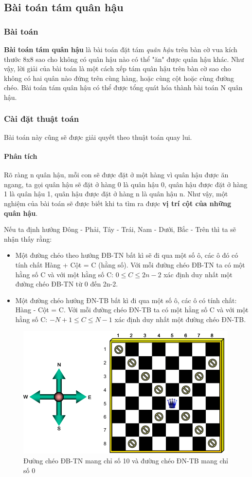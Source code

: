 \documentclass[8pt, a4paper]{article}
\begin{document}
\subsection{Bài toán tám quân hậu}

\subsubsection{Bài toán}
\textbf{Bài toán tám quân hậu} là bài toán đặt tám \emph{quân hậu} trên bàn cờ vua kích thước 8x8 sao cho không có quân hậu nào có thể "ăn" được quân hậu khác. Như vậy, lời giải của bài toán là một cách xếp tám quân hậu trên bàn cờ sao cho không có hai quân nào đứng trên cùng hàng, hoặc cùng cột hoặc cùng đường chéo. Bài toán tám quân hậu có thể được tổng quát hóa thành bài toán N quân hậu.

\subsubsection{Cài đặt thuật toán}
Bài toán này cũng sẽ được giải quyết theo thuật toán quay lui. 


\paragraph{Phân tích}
Rõ ràng n quân hậu, mỗi con sẽ được đặt ở một hàng vì quân hậu được ăn ngang, ta gọi quân hậu sẽ đặt ở hàng 0 là quân hậu 0, quân hậu được đặt ở hàng 1 là quân hậu 1, quân hậu được đặt ở hàng n là quân hậu n. Như vậy, một nghiệm của bài toán sẽ được biết khi ta tìm ra được \textbf{vị trí cột của những quân hậu}.

Nếu ta định hướng Đông - Phải, Tây - Trái, Nam - Dưới, Bắc - Trên thì ta sẽ nhận thấy rằng:
\begin{itemize}
\item Một đường chéo theo hướng ĐB-TN bất kì sẽ đi qua một số ô, các ô đó có tính chất Hàng + Cột = C (hằng số). Với mỗi đường chéo ĐB-TN ta có một hằng số C và với một hằng số C: $0 \le C \le 2n-2$ xác định duy nhất một đường chéo ĐB-TN từ 0 đến 2n-2.
\item Một đường chéo hướng ĐN-TB bất kì đi qua một số ô, các ô có tính chất: Hàng - Cột = C. Với mỗi đường chéo ĐN-TB ta có một hằng số C và với một hằng số C: $-N+1 \le C \le N-1$ xác định duy nhất một đường chéo ĐN-TB.
\end{itemize}
\begin{figure}[htp]
\centering
\includegraphics[scale=0.5]{img/quanhau.png}
\caption{Đường chéo ĐB-TN mang chỉ số 10 và đường chéo ĐN-TB mang chỉ số 0}
\label{}
\end{figure}
\end{document}
